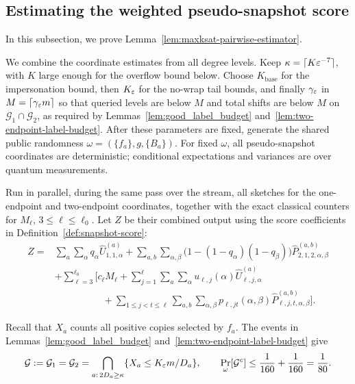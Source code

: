 \subsection{Estimating the weighted pseudo-snapshot score}
\label{sec:proof_of_quantum_algorithm}

In this subsection, we prove Lemma~\ref{lem:maxksat-pairwise-estimator}.

We combine the coordinate estimates from all degree levels. Keep $\kappa=\lceil K\varepsilon^{-7}\rceil$, with $K$ large enough for the overflow bound below.
Choose $K_{\mathrm{base}}$ for the impersonation bound, then $K_\varepsilon$ for the no-wrap tail bounds, and finally $\gamma_\varepsilon$ in $M=\lceil\gamma_\varepsilon m\rceil$ so that queried levels are below $M$ and total shifts are below $M$ on $\mathcal G_1\cap\mathcal G_2$, as required by Lemmas~\ref{lem:good_label_budget} and~\ref{lem:two-endpoint-label-budget}.
After these parameters are fixed, generate the shared public randomness $\omega=(\{f_a\},g,\{B_a\})$.
For fixed $\omega$, all pseudo-snapshot coordinates are deterministic; conditional expectations and variances are over quantum measurements.

Run in parallel, during the same pass over the stream, all sketches for the one-endpoint and two-endpoint coordinates, together with the exact classical counters for $M_\ell$, $3\le\ell\le\ell_0$.
Let $Z$ be their combined output using the score coefficients in Definition~\ref{def:snapshot-score}:
\[
\begin{aligned}
Z
={}&\sum_a\sum_\alpha q_\alpha\widehat U^{(a)}_{1,1,\alpha}
+\sum_{a,b}\sum_{\alpha,\beta}
  \bigl(1-(1-q_\alpha)(1-q_\beta)\bigr)
  \widehat P^{(a,b)}_{2,1,2,\alpha,\beta}\\
&+\sum_{\ell=3}^{\ell_0}\bigg[
  c_\ell M_\ell
  +\sum_{j=1}^\ell\sum_a\sum_\alpha
    u_{\ell,j}(\alpha)\widehat U^{(a)}_{\ell,j,\alpha}\\
&\hspace{5em}+\sum_{1\le j<t\le\ell}\sum_{a,b}\sum_{\alpha,\beta}
    p_{\ell,jt}(\alpha,\beta)
    \widehat P^{(a,b)}_{\ell,j,t,\alpha,\beta}\bigg].
\end{aligned}
\]

Recall that $X_a$ counts all positive copies selected by $f_a$. The events in Lemmas~\ref{lem:good_label_budget} and~\ref{lem:two-endpoint-label-budget} give
\[
\mathcal G:=\mathcal G_1=\mathcal G_2
=\bigcap_{a:\,2D_a\ge\kappa}\{X_a\le K_\varepsilon m/D_a\},\qquad
\Pr_\omega[\mathcal G^c]\le\frac1{160}+\frac1{160}=\frac1{80}.
\]

